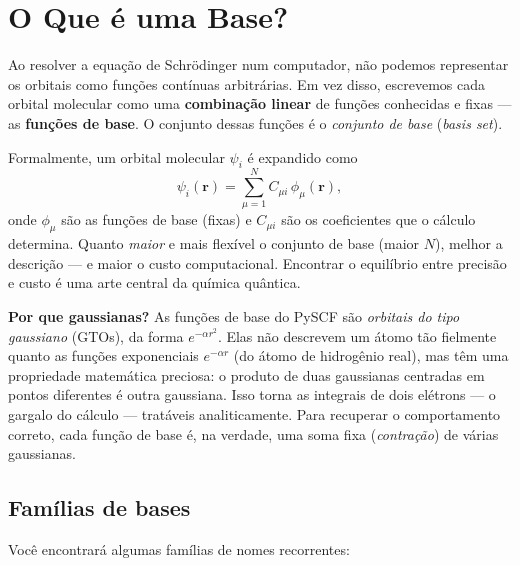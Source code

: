 \documentclass[11pt,a4paper,openany]{book}
\newcommand{\pyscf}{\textsf{PySCF}}
\begin{document}
\section{O Que é uma Base?}
\label{sec:base}

Ao resolver a equação de Schrödinger num computador, não podemos representar os
orbitais como funções contínuas arbitrárias. Em vez disso, escrevemos cada
orbital molecular como uma \textbf{combinação linear} de funções conhecidas e
fixas --- as \textbf{funções de base}. O conjunto dessas funções é o
\emph{conjunto de base} (\emph{basis set}).

Formalmente, um orbital molecular $\psi_i$ é expandido como
\[
  \psi_i(\mathbf{r}) = \sum_{\mu=1}^{N} C_{\mu i}\,\phi_\mu(\mathbf{r}),
\]
onde $\phi_\mu$ são as funções de base (fixas) e $C_{\mu i}$ são os coeficientes
que o cálculo determina. Quanto \emph{maior} e mais flexível o conjunto de base
(maior $N$), melhor a descrição --- e maior o custo computacional. Encontrar o
equilíbrio entre precisão e custo é uma arte central da química quântica.

\begin{caixanota}
\textbf{Por que gaussianas?} As funções de base do \pyscf{} são \emph{orbitais do
tipo gaussiano} (GTOs), da forma $e^{-\alpha r^2}$. Elas não descrevem um átomo
tão fielmente quanto as funções exponenciais $e^{-\alpha r}$ (do átomo de
hidrogênio real), mas têm uma propriedade matemática preciosa: o produto de duas
gaussianas centradas em pontos diferentes é outra gaussiana. Isso torna as
integrais de dois elétrons --- o gargalo do cálculo --- tratáveis analiticamente.
Para recuperar o comportamento correto, cada função de base é, na verdade, uma
soma fixa (\emph{contração}) de várias gaussianas.
\end{caixanota}

\subsection{Famílias de bases}

Você encontrará algumas famílias de nomes recorrentes:
\end{document}
